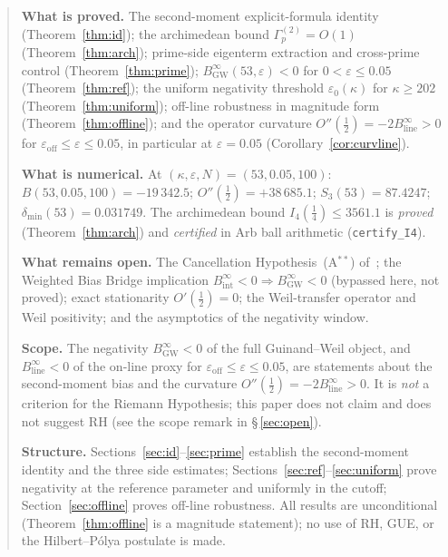 \documentclass[11pt]{article}
\newcommand{\BinfGW}{B_{\mathrm{GW}}^{\infty}}   %
\newcommand{\Binfline}{B_{\mathrm{line}}^{\infty}} %
\newcommand{\dmin}{\delta_{\min}}           %
\newcommand{\Gp}{\Gamma_p^{(2)}}            %
\begin{document}
\begin{abstract}
\textbf{What is proved.}
The second-moment explicit-formula identity (Theorem~\ref{thm:id});
the archimedean bound $\Gp=O(1)$ (Theorem~\ref{thm:arch});
prime-side eigenterm extraction and cross-prime control
(Theorem~\ref{thm:prime});
$\BinfGW(53,\varepsilon)<0$ for $0<\varepsilon\le 0.05$
(Theorem~\ref{thm:ref});
the uniform negativity threshold $\varepsilon_0(\kappa)$ for $\kappa\ge 202$
(Theorem~\ref{thm:uniform}); off-line robustness in magnitude form
(Theorem~\ref{thm:offline}); and the operator curvature
$O''(\tfrac12)=-2\Binfline>0$ for
$\varepsilon_{\mathrm{off}}\le\varepsilon\le 0.05$,
in particular at $\varepsilon=0.05$ (Corollary~\ref{cor:curvline}).

\textbf{What is numerical.}
At $(\kappa,\varepsilon,N)=(53,0.05,100)$:
$B(53,0.05,100)=-19\,342.5$; $O''(\tfrac12)=+38\,685.1$;
$S_3(53)=87.4247$; $\dmin(53)=0.031749$.
The archimedean bound $I_4(\tfrac14)\le 3561.1$ is \emph{proved}
(Theorem~\ref{thm:arch}) and \emph{certified} in Arb ball arithmetic
(\texttt{certify\_I4}).

\textbf{What remains open.}
The Cancellation Hypothesis~(A$^{**}$) of~\cite{Paper7};
the Weighted Bias Bridge implication
$B_{\mathrm{int}}^\infty<0\Rightarrow\BinfGW<0$ (bypassed here, not proved);
exact stationarity $O'(\tfrac12)=0$;
the Weil-transfer operator and Weil positivity;
and the asymptotics of the negativity window.

\textbf{Scope.}
The negativity $\BinfGW<0$ of the full Guinand--Weil object, and
$\Binfline<0$ of the on-line proxy for
$\varepsilon_{\mathrm{off}}\le\varepsilon\le 0.05$,
are statements about the second-moment bias and the curvature
$O''(\tfrac12)=-2\Binfline>0$.
It is \emph{not} a criterion for the Riemann Hypothesis; this paper does
not claim and does not suggest RH (see the scope remark in
\S\,\ref{sec:open}).

\textbf{Structure.}
Sections~\ref{sec:id}--\ref{sec:prime} establish the second-moment
identity and the three side estimates;
Sections~\ref{sec:ref}--\ref{sec:uniform} prove negativity at the
reference parameter and uniformly in the cutoff;
Section~\ref{sec:offline} proves off-line robustness.
All results are unconditional (Theorem~\ref{thm:offline} is a magnitude
statement); no use of RH, GUE, or the Hilbert--P\'olya postulate is made.
\end{abstract}

\vspace{2em}

\end{document}
